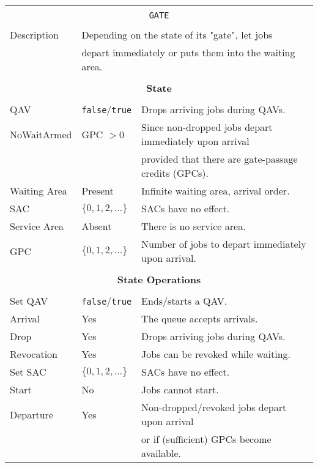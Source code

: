 \documentclass[12pt]{book}
\begin{document}
\begin{tabular}{|l|l|l|}
\hline
\multicolumn{3}{|c|}{} \\
\multicolumn{3}{|c|}{\lstinline[basicstyle=\large]{GATE}} \\
\multicolumn{3}{|c|}{} \\
\hline
Description & \multicolumn{2}{|l|}{Depending on the state of its "gate", let jobs} \\
            & \multicolumn{2}{|l|}{depart immediately or puts them into the waiting area.} \\
\hline
\multicolumn{3}{|c|}{} \\
\multicolumn{3}{|c|}{\bf State} \\
\multicolumn{3}{|c|}{} \\
\hline
QAV & \lstinline|false|/\lstinline|true| & Drops arriving jobs during QAVs. \\
\hline
NoWaitArmed & GPC $> 0$ & Since non-dropped jobs depart immediately upon arrival \\
            &           & provided that there are gate-passage credits (GPCs). \\
\hline
Waiting Area & Present & Infinite waiting area, arrival order. \\
\hline
SAC & $\{0, 1, 2, \ldots\}$ & SACs have no effect. \\
\hline
Service Area & Absent & There is no service area. \\
\hline
GPC & $\{0, 1, 2, \ldots\}$ & Number of jobs to depart immediately upon arrival. \\
\hline
\multicolumn{3}{|c|}{} \\
\multicolumn{3}{|c|}{\bf State Operations} \\
\multicolumn{3}{|c|}{} \\
\hline
Set QAV & \lstinline|false|/\lstinline|true| & Ends/starts a QAV. \\
\hline
Arrival & Yes & The queue accepts arrivals. \\
\hline
Drop & Yes & Drops arriving jobs during QAVs. \\
\hline
Revocation & Yes & Jobs can be revoked while waiting. \\
\hline
Set SAC & $\{0, 1, 2, \ldots\}$ & SACs have no effect. \\
\hline
Start & No & Jobs cannot start. \\
\hline
Departure & Yes & Non-dropped/revoked jobs depart upon arrival \\
          &     & or if (sufficient) GPCs become available. \\

\end{tabular}
\end{document}
